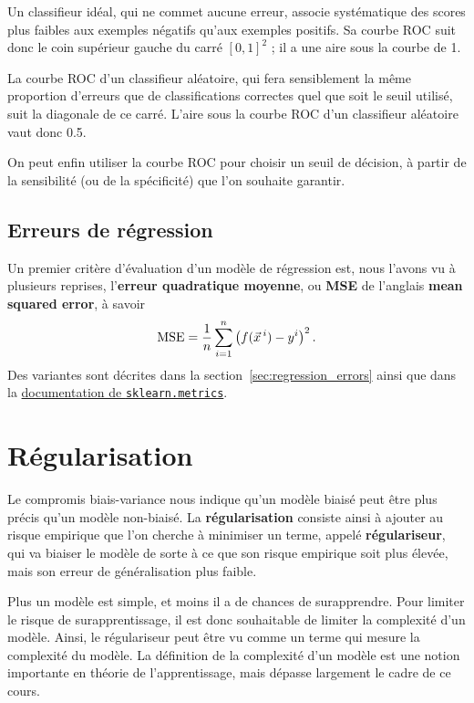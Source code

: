 Un classifieur idéal, qui ne commet aucune erreur, associe systématique des
scores plus faibles aux exemples négatifs qu'aux exemples positifs. Sa courbe
ROC suit donc le coin supérieur gauche du carré $[0, 1]^2$ ; il a une aire sous
la courbe de 1.

La courbe ROC d'un classifieur aléatoire, qui fera sensiblement la même
proportion d'erreurs que de classifications correctes quel que soit le seuil
utilisé, suit la diagonale de ce carré. L'aire sous la courbe ROC d'un
classifieur aléatoire vaut donc 0.5.

On peut enfin utiliser la courbe ROC pour choisir un seuil de décision, à
partir de la sensibilité (ou de la spécificité) que l'on souhaite garantir.

\subsection{Erreurs de régression}
Un premier critère d'évaluation d'un modèle de régression est, nous l'avons vu
à plusieurs reprises, l'\textbf{erreur quadratique moyenne}, ou \textbf{MSE} de
l'anglais \textbf{mean squared error}, à savoir
\begin{equation*}
  \text{MSE} = \frac1n \sum_{i=1}^n \left( f(\xx^i) - y^i \right)^2.
\end{equation*}
Des variantes sont décrites dans la section~\ref{sec:regression_errors} ainsi que dans la \href{https://scikit-learn.org/stable/modules/model_evaluation.html#regression-metrics}{documentation de \texttt{sklearn.metrics}}.

\section{Régularisation}
\label{sec:generalization_regularization}
Le compromis biais-variance nous indique qu'un modèle biaisé peut être plus
précis qu'un modèle non-biaisé. La \textbf{régularisation} consiste ainsi à
ajouter au risque empirique que l'on cherche à minimiser un terme, appelé
\textbf{régulariseur}, qui va biaiser le modèle de sorte à ce que son risque
empirique soit plus élevée, mais son erreur de généralisation plus faible.

Plus un modèle est simple, et moins il a de chances de surapprendre. Pour
limiter le risque de surapprentissage, il est donc souhaitable de limiter la
complexité d'un modèle. Ainsi, le régulariseur peut être vu comme un terme qui
mesure la complexité du modèle. La définition de la complexité d'un modèle est
une notion importante en théorie de l'apprentissage, mais dépasse largement le
cadre de ce cours.

